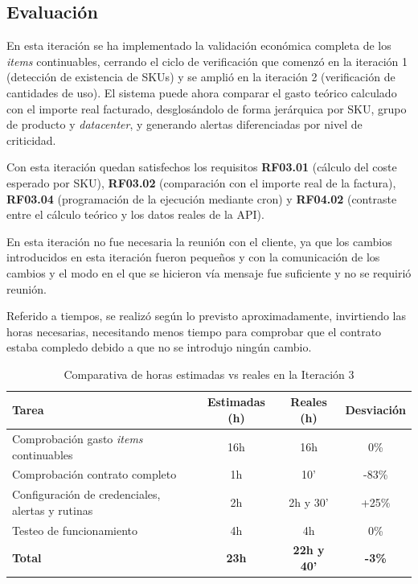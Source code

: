 \subsection{Evaluación}

En esta iteración se ha implementado la validación económica completa de los \textit{items} continuables, cerrando el ciclo de verificación que comenzó en la iteración 1 (detección de existencia de SKUs) y se amplió en la iteración 2 (verificación de cantidades de uso). El sistema puede ahora comparar el gasto teórico calculado con el importe real facturado, desglosándolo de forma jerárquica por SKU, grupo de producto y \textit{datacenter}, y generando alertas diferenciadas por nivel de criticidad.

Con esta iteración quedan satisfechos los requisitos \textbf{RF03.01} (cálculo del coste esperado por SKU), \textbf{RF03.02} (comparación con el importe real de la factura), \textbf{RF03.04} (programación de la ejecución mediante cron) y \textbf{RF04.02} (contraste entre el cálculo teórico y los datos reales de la API).

En esta iteración no fue necesaria la reunión con el cliente, ya que los cambios introducidos en esta iteración fueron pequeños y con la comunicación de los cambios y el modo en el que se hicieron vía mensaje fue suficiente y no se requirió reunión. 

Referido a tiempos, se realizó según lo previsto aproximadamente, invirtiendo las horas necesarias, necesitando menos tiempo para comprobar que el contrato estaba compledo debido a que no se introdujo ningún cambio.

\begin{table}[H]
    \centering
    \begin{tabular}{|l|c|c|c|}
        \hline
        \textbf{Tarea} & \textbf{Estimadas (h)} & \textbf{Reales (h)} & \textbf{Desviación} \\
        \hline
        Comprobación gasto \textit{items} continuables & 16h & 16h & 0\% \\
        Comprobación contrato completo & 1h & 10' & -83\% \\
        Configuración de credenciales, alertas y rutinas & 2h & 2h y 30' & +25\% \\
        Testeo de funcionamiento & 4h & 4h & 0\% \\
        \hline
        \textbf{Total} & \textbf{23h} & \textbf{22h y 40'} & \textbf{-3\%} \\
        \hline
    \end{tabular}
    \caption{Comparativa de horas estimadas vs reales en la Iteración 3}
    \label{tab:horas-iteracion3}
\end{table}

